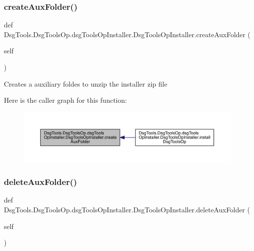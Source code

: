 \subsubsection{\texorpdfstring{create\+Aux\+Folder()}{createAuxFolder()}}
{\footnotesize\ttfamily def Dsg\+Tools.\+Dsg\+Tools\+Op.\+dsg\+Tools\+Op\+Installer.\+Dsg\+Tools\+Op\+Installer.\+create\+Aux\+Folder (\begin{DoxyParamCaption}\item[{}]{self }\end{DoxyParamCaption})}

\begin{DoxyVerb}Creates a auxiliary foldes to unzip the installer zip file
\end{DoxyVerb}
 Here is the caller graph for this function\+:
\nopagebreak
\begin{figure}[H]
\begin{center}
\leavevmode
\includegraphics[width=350pt]{class_dsg_tools_1_1_dsg_tools_op_1_1dsg_tools_op_installer_1_1_dsg_tools_op_installer_a71b1b13badaea73c9c90f631fad8ba36_icgraph}
\end{center}
\end{figure}
\mbox{\label{class_dsg_tools_1_1_dsg_tools_op_1_1dsg_tools_op_installer_1_1_dsg_tools_op_installer_a5befb368651c765f8e147325cfcb8b04}} 
\subsubsection{\texorpdfstring{delete\+Aux\+Folder()}{deleteAuxFolder()}}
{\footnotesize\ttfamily def Dsg\+Tools.\+Dsg\+Tools\+Op.\+dsg\+Tools\+Op\+Installer.\+Dsg\+Tools\+Op\+Installer.\+delete\+Aux\+Folder (\begin{DoxyParamCaption}\item[{}]{self }\end{DoxyParamCaption})}

